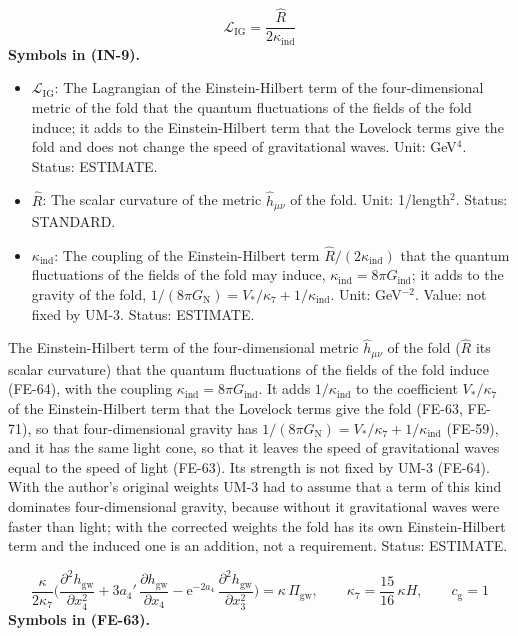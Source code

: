 \documentclass[
  10pt,
]{article}
\providecommand{\tightlist}{%
  \setlength{\itemsep}{0pt}\setlength{\parskip}{0pt}}
\begin{document}
\[
\mathcal{L}_{\mathrm{IG}} = \frac{\hat R}{2\kappa_{\mathrm{ind}}} \tag{IN-9}
\] \textbf{Symbols in (IN-9).}

\begin{itemize}
\tightlist
\item
  \(\mathcal{L}_{\mathrm{IG}}\): The Lagrangian of the Einstein-Hilbert
  term of the four-dimensional metric of the fold that the quantum
  fluctuations of the fields of the fold induce; it adds to the
  Einstein-Hilbert term that the Lovelock terms give the fold and does
  not change the speed of gravitational waves. Unit: GeV\(^4\). Status:
  ESTIMATE.
\item
  \(\hat R\): The scalar curvature of the metric \(\hat h_{\mu\nu}\) of
  the fold. Unit: 1/length\(^2\). Status: STANDARD.
\item
  \(\kappa_{\mathrm{ind}}\): The coupling of the Einstein-Hilbert term
  \(\hat R/(2\kappa_{\mathrm{ind}})\) that the quantum fluctuations of
  the fields of the fold may induce,
  \(\kappa_{\mathrm{ind}} = 8\pi G_{\mathrm{ind}}\); it adds to the
  gravity of the fold,
  \(1/(8\pi G_{\mathrm{N}}) = V_*/\kappa_7 + 1/\kappa_{\mathrm{ind}}\).
  Unit: GeV\(^{-2}\). Value: not fixed by UM-3. Status: ESTIMATE.
\end{itemize}

The Einstein-Hilbert term of the four-dimensional metric
\(\hat h_{\mu\nu}\) of the fold (\(\hat R\) its scalar curvature) that
the quantum fluctuations of the fields of the fold induce (FE-64), with
the coupling \(\kappa_{\mathrm{ind}} = 8\pi G_{\mathrm{ind}}\). It adds
\(1/\kappa_{\mathrm{ind}}\) to the coefficient \(V_*/\kappa_7\) of the
Einstein-Hilbert term that the Lovelock terms give the fold (FE-63,
FE-71), so that four-dimensional gravity has
\(1/(8\pi G_{\mathrm{N}}) = V_*/\kappa_7 + 1/\kappa_{\mathrm{ind}}\)
(FE-59), and it has the same light cone, so that it leaves the speed of
gravitational waves equal to the speed of light (FE-63). Its strength is
not fixed by UM-3 (FE-64). With the author's original weights UM-3 had
to assume that a term of this kind dominates four-dimensional gravity,
because without it gravitational waves were faster than light; with the
corrected weights the fold has its own Einstein-Hilbert term and the
induced one is an addition, not a requirement. Status: ESTIMATE.

\[
\frac{\kappa}{2\kappa_7}\Big(\frac{\partial^2h_{\mathrm{gw}}}{\partial x_4^2} + 3a_4'\,\frac{\partial h_{\mathrm{gw}}}{\partial x_4}
 - \mathrm{e}^{-2a_4}\,\frac{\partial^2h_{\mathrm{gw}}}{\partial x_3^2}\Big) = \kappa\,\Pi_{\mathrm{gw}},\qquad
\kappa_7 = \frac{15}{16}\,\kappa H,\qquad c_{\mathrm{g}} = 1 \tag{FE-63}
\] \textbf{Symbols in (FE-63).}
\end{document}
